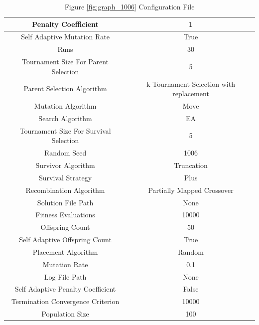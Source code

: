 \documentclass{standalone}
\begin{document}
\begin{table}[!htb]
	\centering
	\caption{Figure \ref{fig:graph_1006} Configuration File}
	\label{tab:graph_1006}
	\begin{tabular}{| c | c |}
		\hline
		Penalty Coefficient		& 1		 \\
		\hline
		Self Adaptive Mutation Rate		& True		 \\
		\hline
		Runs		& 30		 \\
		\hline
		Tournament Size For Parent Selection		& 5		 \\
		\hline
		Parent Selection Algorithm		& k-Tournament Selection with replacement		 \\
		\hline
		Mutation Algorithm		& Move		 \\
		\hline
		Search Algorithm		& EA		 \\
		\hline
		Tournament Size For Survival Selection		& 5		 \\
		\hline
		Random Seed		& 1006		 \\
		\hline
		Survivor Algorithm		& Truncation		 \\
		\hline
		Survival Strategy		& Plus		 \\
		\hline
		Recombination Algorithm		& Partially Mapped Crossover		 \\
		\hline
		Solution File Path		& None		 \\
		\hline
		Fitness Evaluations		& 10000		 \\
		\hline
		Offspring Count		& 50		 \\
		\hline
		Self Adaptive Offspring Count		& True		 \\
		\hline
		Placement Algorithm		& Random		 \\
		\hline
		Mutation Rate		& 0.1		 \\
		\hline
		Log File Path		& None		 \\
		\hline
		Self Adaptive Penalty Coefficient		& False		 \\
		\hline
		Termination Convergence Criterion		& 10000		 \\
		\hline
		Population Size		& 100		 \\
		\hline
	\end{tabular}
\end{table}
\end{document}
